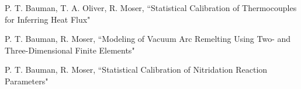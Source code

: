 P. T. Bauman, T. A. Oliver, R. Moser,
``Statistical Calibration of Thermocouples for Inferring Heat Flux"

\blankline

P. T. Bauman, R. Moser,
``Modeling of Vacuum Arc Remelting Using Two- and Three-Dimensional Finite Elements"

\blankline

P. T. Bauman, R. Moser,
``Statistical Calibration of Nitridation Reaction Parameters"

